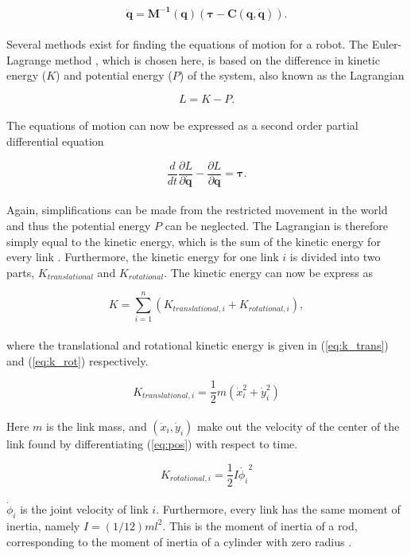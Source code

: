 \begin{equation}\label{eq:eom_qdd}
    \mathbf{\ddot{q}} = \mathbf{M^{-1}(q)}( \boldsymbol{\tau} - \mathbf{C(q, \dot{q})}).
\end{equation}
\\
Several methods exist for finding the equations of motion for a robot. The Euler-Lagrange method \cite{lynch2017modern}, which  is chosen here, is based on the difference in kinetic energy ($K$) and potential energy ($P$) of the system, also known as the Lagrangian

\begin{equation}
    L = K - P.
\end{equation}
\\
The equations of motion can now be expressed as a second order partial differential equation

\begin{equation} \label{eq:Lagrange}
    \frac{d}{d t} \frac{\partial L}{\partial \mathbf{\dot{q}}} - \frac{\partial L}{\partial \mathbf{q}} = \boldsymbol{\tau}.
\end{equation}
\\
Again, simplifications can be made from the restricted movement in the world and thus the potential energy $P$ can be neglected. The Lagrangian is therefore simply equal to the kinetic energy, which is the sum of the kinetic energy for every link \cite{rezapour2014path}. Furthermore, the kinetic energy for one link $i$ is divided into two parts, $K_{translational}$ and $K_{rotational}$.
The kinetic energy can now be express as

\begin{equation}\label{eq:kinen}
    K = \sum_{i=1}^{n} (K_{translational,i} + K_{rotational,i}),
\end{equation}
\\
where the translational and rotational kinetic energy is given in (\ref{eq:k_trans}) and (\ref{eq:k_rot}) respectively.

\begin{equation} \label{eq:k_trans}
    K_{translational,i} = \frac{1}{2} m (\dot{x}_i^2 + \dot{y}_i^2)
\end{equation}
\\
Here $m$ is the link mass, and $(\dot{x}_i, \dot{y}_i)$ make out the velocity of the center of the link found by differentiating (\ref{eq:pos}) with respect to time. 

\begin{equation} \label{eq:k_rot}
    K_{rotational,i} = \frac{1}{2}I\dot{\phi_i}^2
\end{equation}
\\
$\dot{\phi}_i$ is the joint velocity of link $i$. Furthermore, every link has the same moment of inertia, namely $I = (1/12)ml^2$. This is the moment of inertia of a rod, corresponding to the moment of inertia of a cylinder with zero radius \cite{lynch2017modern}.


